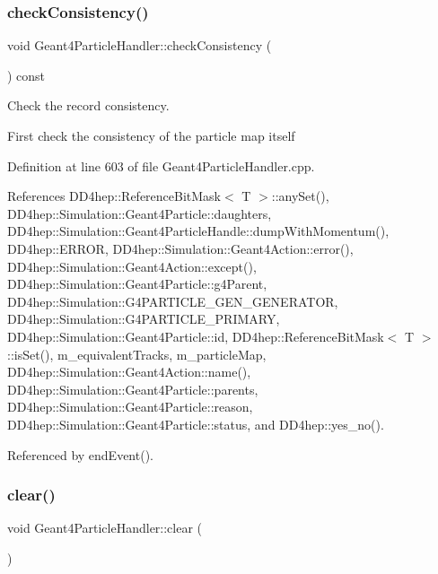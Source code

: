 \subsubsection{\texorpdfstring{check\+Consistency()}{checkConsistency()}}
{\footnotesize\ttfamily void Geant4\+Particle\+Handler\+::check\+Consistency (\begin{DoxyParamCaption}{ }\end{DoxyParamCaption}) const\hspace{0.3cm}{\ttfamily [protected]}}



Check the record consistency. 

First check the consistency of the particle map itself 

Definition at line 603 of file Geant4\+Particle\+Handler.\+cpp.



References D\+D4hep\+::\+Reference\+Bit\+Mask$<$ T $>$\+::any\+Set(), D\+D4hep\+::\+Simulation\+::\+Geant4\+Particle\+::daughters, D\+D4hep\+::\+Simulation\+::\+Geant4\+Particle\+Handle\+::dump\+With\+Momentum(), D\+D4hep\+::\+E\+R\+R\+OR, D\+D4hep\+::\+Simulation\+::\+Geant4\+Action\+::error(), D\+D4hep\+::\+Simulation\+::\+Geant4\+Action\+::except(), D\+D4hep\+::\+Simulation\+::\+Geant4\+Particle\+::g4\+Parent, D\+D4hep\+::\+Simulation\+::\+G4\+P\+A\+R\+T\+I\+C\+L\+E\+\_\+\+G\+E\+N\+\_\+\+G\+E\+N\+E\+R\+A\+T\+OR, D\+D4hep\+::\+Simulation\+::\+G4\+P\+A\+R\+T\+I\+C\+L\+E\+\_\+\+P\+R\+I\+M\+A\+RY, D\+D4hep\+::\+Simulation\+::\+Geant4\+Particle\+::id, D\+D4hep\+::\+Reference\+Bit\+Mask$<$ T $>$\+::is\+Set(), m\+\_\+equivalent\+Tracks, m\+\_\+particle\+Map, D\+D4hep\+::\+Simulation\+::\+Geant4\+Action\+::name(), D\+D4hep\+::\+Simulation\+::\+Geant4\+Particle\+::parents, D\+D4hep\+::\+Simulation\+::\+Geant4\+Particle\+::reason, D\+D4hep\+::\+Simulation\+::\+Geant4\+Particle\+::status, and D\+D4hep\+::yes\+\_\+no().



Referenced by end\+Event().

\hypertarget{class_d_d4hep_1_1_simulation_1_1_geant4_particle_handler_a3d3d90e1e70f18337199c27da300c75d}{}\label{class_d_d4hep_1_1_simulation_1_1_geant4_particle_handler_a3d3d90e1e70f18337199c27da300c75d} 
\subsubsection{\texorpdfstring{clear()}{clear()}}
{\footnotesize\ttfamily void Geant4\+Particle\+Handler\+::clear (\begin{DoxyParamCaption}{ }\end{DoxyParamCaption})\hspace{0.3cm}{\ttfamily [protected]}}



